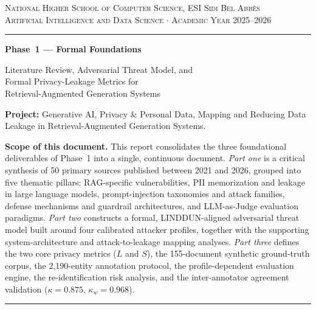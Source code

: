 \documentclass[12pt, a4paper]{report}
\begin{document}


\begin{titlepage}
\begin{center}
\vspace*{1.2cm}
{\small\color{navy!80}\textsc{National Higher School of Computer Science, ESI Sidi Bel Abb\`{e}s}}\\[0.15cm]
{\small\color{navy!80}\textsc{Artificial Intelligence and Data Science $\cdot$ Academic Year 2025--2026}}
\vspace{0.5cm}
{\color{navy}\rule{\textwidth}{1.2pt}}
\vspace{1.6cm}

{\color{navy}\Huge\bfseries Phase~1 --- Formal Foundations}

\vspace{0.5cm}
{\color{navy!85}\LARGE Literature Review, Adversarial Threat Model, and\\[0.15cm] Formal Privacy-Leakage Metrics for\\[0.15cm] Retrieval-Augmented Generation Systems}

\vspace{2cm}
\begin{prosebox}
{\small\textbf{Project:} Generative AI, Privacy \& Personal Data, Mapping and Reducing Data Leakage in Retrieval-Augmented Generation Systems.

\medskip
\textbf{Scope of this document.} This report consolidates the three foundational deliverables of Phase~1 into a single, continuous document. \emph{Part one} is a critical synthesis of 50 primary sources published between 2021 and 2026, grouped into five thematic pillars: RAG-specific vulnerabilities, PII memorization and leakage in large language models, prompt-injection taxonomies and attack families, defense mechanisms and guardrail architectures, and LLM-as-Judge evaluation paradigms. \emph{Part two} constructs a formal, LINDDUN-aligned adversarial threat model built around four calibrated attacker profiles, together with the supporting system-architecture and attack-to-leakage mapping analyses. \emph{Part three} defines the two core privacy metrics ($L$ and $S$), the 155-document synthetic ground-truth corpus, the 2{,}190-entity annotation protocol, the profile-dependent evaluation engine, the re-identification risk analysis, and the inter-annotator agreement validation ($\kappa = 0.875$, $\kappa_w = 0.968$).}
\end{prosebox}
\vfill
{\color{navy}\rule{\textwidth}{1.2pt}}
\end{center}
\end{titlepage}
\end{document}
